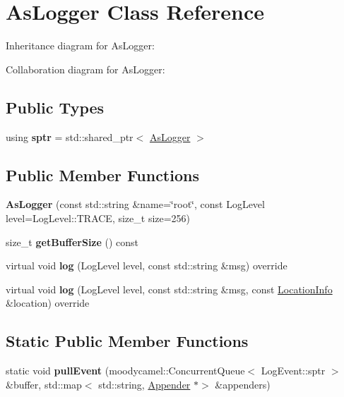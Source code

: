 \hypertarget{classAsLogger}{}\section{As\+Logger Class Reference}
\label{classAsLogger}


Inheritance diagram for As\+Logger\+:


Collaboration diagram for As\+Logger\+:
\subsection*{Public Types}
\begin{DoxyCompactItemize}
\item 
\mbox{\label{classAsLogger_a60984807720c9c18f8f4186d01003111}} 
using {\bfseries sptr} = std\+::shared\+\_\+ptr$<$ \hyperlink{classAsLogger}{As\+Logger} $>$
\end{DoxyCompactItemize}
\subsection*{Public Member Functions}
\begin{DoxyCompactItemize}
\item 
\mbox{\label{classAsLogger_a416599debb3a39416430d0fedbf91eb4}} 
{\bfseries As\+Logger} (const std\+::string \&name=\char`\"{}root\char`\"{}, const Log\+Level level=Log\+Level\+::\+T\+R\+A\+CE, size\+\_\+t size=256)
\item 
\mbox{\label{classAsLogger_ad77ad5f194443555bd5d22ed4717e2f7}} 
size\+\_\+t {\bfseries get\+Buffer\+Size} () const
\item 
\mbox{\label{classAsLogger_a068d3d463b741717681f424efb04b44b}} 
virtual void {\bfseries log} (Log\+Level level, const std\+::string \&msg) override
\item 
\mbox{\label{classAsLogger_a40830ed6bb4e144afdd753ac368b0770}} 
virtual void {\bfseries log} (Log\+Level level, const std\+::string \&msg, const \hyperlink{classLocationInfo}{Location\+Info} \&location) override
\end{DoxyCompactItemize}
\subsection*{Static Public Member Functions}
\begin{DoxyCompactItemize}
\item 
\mbox{\label{classAsLogger_a8a82014777371cbdfcfc5d16746d39d9}} 
static void {\bfseries pull\+Event} (moodycamel\+::\+Concurrent\+Queue$<$ Log\+Event\+::sptr $>$ \&buffer, std\+::map$<$ std\+::string, \hyperlink{classAppender}{Appender} $\ast$$>$ \&appenders)
\end{DoxyCompactItemize}

